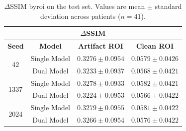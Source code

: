 \begin{table}[htbp]
    \centering
    \small
    \begin{tabular}{cccc}
        \multicolumn{4}{c}{\textbf{$\Delta$SSIM}} \\[4pt]
        \hline
        \textbf{Seed} & \textbf{Model} & \textbf{Artifact ROI} & \textbf{Clean ROI} \\
        \hline
        \multirow{2}{*}{42} & Single Model & $0.3276 \pm 0.0954$ & $0.0579 \pm 0.0426$ \\
                             & Dual Model   & $0.3233 \pm 0.0937$ & $0.0568 \pm 0.0421$ \\
        \hline
        \multirow{2}{*}{1337} & Single Model & $0.3278 \pm 0.0933$ & $0.0582 \pm 0.0421$ \\
                               & Dual Model   & $0.3224 \pm 0.0953$ & $0.0566 \pm 0.0422$ \\
        \hline
        \multirow{2}{*}{2024} & Single Model & $0.3279 \pm 0.0955$ & $0.0581 \pm 0.0422$ \\
                               & Dual Model   & $0.3266 \pm 0.0954$ & $0.0576 \pm 0.0422$ \\
        \hline
    \end{tabular}
    \captionsetup{skip=2pt}
    \caption[ROI $\Delta$SSIM]{$\Delta$SSIM by\acrshort{roi} on the test set. Values are mean $\pm$ standard deviation across patients ($n=41$).}
    \label{tab:roi-delta-ssim}
\end{table}
    
